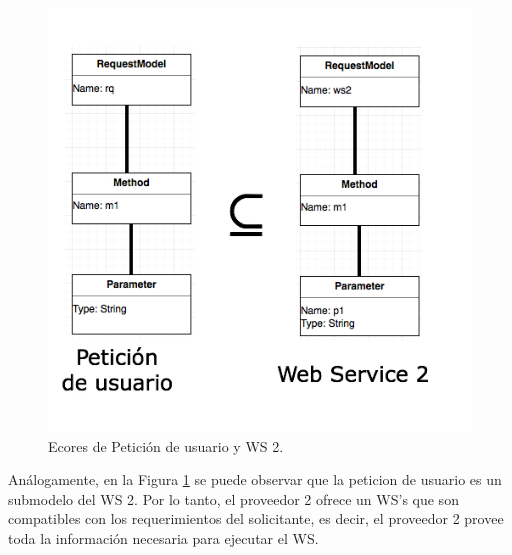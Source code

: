 \begin{figure}[!h] 
	\begin{center}
		\includegraphics [scale=0.60]{imagenes/Ecores_de_Peticion_de_usuario_y_WS_2.jpg}
	\end{center}
	\caption{Ecores de Petición de usuario y WS 2.}
	\label{fig:Ecores de Petición de usuario y WS 2}
\end{figure} 

Análogamente, en la Figura \ref{fig:Ecores de Petición de usuario y WS 2} se puede observar que la peticion de usuario es un submodelo del WS 2. Por lo tanto, el proveedor 2 ofrece un WS's que son compatibles con los requerimientos del solicitante, es decir, el proveedor 2 provee toda la información necesaria para ejecutar el WS.